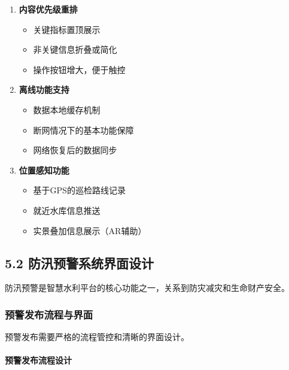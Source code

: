 \begin{enumerate}
\def\labelenumi{\arabic{enumi}.}
\tightlist
\item
  \textbf{内容优先级重排}

  \begin{itemize}
  \tightlist
  \item
    关键指标置顶展示
  \item
    非关键信息折叠或简化
  \item
    操作按钮增大，便于触控
  \end{itemize}
\item
  \textbf{离线功能支持}

  \begin{itemize}
  \tightlist
  \item
    数据本地缓存机制
  \item
    断网情况下的基本功能保障
  \item
    网络恢复后的数据同步
  \end{itemize}
\item
  \textbf{位置感知功能}

  \begin{itemize}
  \tightlist
  \item
    基于GPS的巡检路线记录
  \item
    就近水库信息推送
  \item
    实景叠加信息展示（AR辅助）
  \end{itemize}
\end{enumerate}

\subsection{5.2
防汛预警系统界面设计}\label{ux9632ux6c5bux9884ux8b66ux7cfbux7edfux754cux9762ux8bbeux8ba1}

防汛预警是智慧水利平台的核心功能之一，关系到防灾减灾和生命财产安全。

\subsubsection{预警发布流程与界面}\label{ux9884ux8b66ux53d1ux5e03ux6d41ux7a0bux4e0eux754cux9762}

预警发布需要严格的流程管控和清晰的界面设计。

\paragraph{预警发布流程设计}\label{ux9884ux8b66ux53d1ux5e03ux6d41ux7a0bux8bbeux8ba1}

